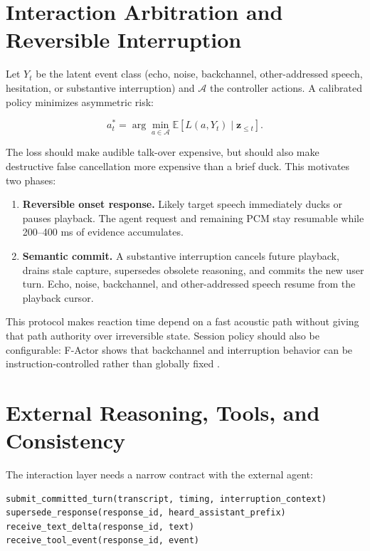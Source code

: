 \documentclass[11pt]{article}
\newcommand{\vect}[1]{\boldsymbol{#1}}
\begin{document}
\section{Interaction Arbitration and Reversible Interruption}

Let $Y_t$ be the latent event class (echo, noise, backchannel,
other-addressed speech, hesitation, or substantive interruption) and
$\mathcal A$ the controller actions. A calibrated policy minimizes asymmetric
risk:

\begin{equation}
  a_t^*=\arg\min_{a\in\mathcal A}
  \mathbb E\!\left[L(a,Y_t)\mid \vect z_{\le t}\right].
  \label{eq:risk}
\end{equation}

The loss should make audible talk-over expensive, but should also make
destructive false cancellation more expensive than a brief duck. This motivates
two phases:

\begin{enumerate}[leftmargin=*]
  \item \textbf{Reversible onset response.} Likely target speech immediately
        ducks or pauses playback. The agent request and remaining PCM stay
        resumable while 200--400 ms of evidence accumulates.
  \item \textbf{Semantic commit.} A substantive interruption cancels future
        playback, drains stale capture, supersedes obsolete reasoning, and
        commits the new user turn. Echo, noise, backchannel, and other-addressed
        speech resume from the playback cursor.
\end{enumerate}

This protocol makes reaction time depend on a fast acoustic path without giving
that path authority over irreversible state. Session policy should also be
configurable: F-Actor shows that backchannel and interruption behavior can be
instruction-controlled rather than globally fixed \citep{zufle2026factor}.

\section{External Reasoning, Tools, and Consistency}

The interaction layer needs a narrow contract with the external agent:

\begin{verbatim}
submit_committed_turn(transcript, timing, interruption_context)
supersede_response(response_id, heard_assistant_prefix)
receive_text_delta(response_id, text)
receive_tool_event(response_id, event)
\end{verbatim}
\end{document}
